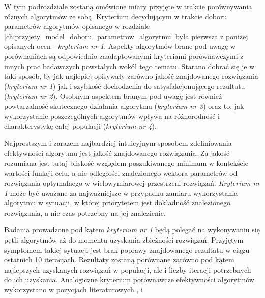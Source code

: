 \par
W tym podrozdziale zostaną omówione miary przyjęte w trakcie porównywania różnych algorytmów ze sobą. Kryterium decydującym w trakcie doboru parametrów algorytmów opisanego w rozdziale \ref{ch:przyjety_model_doboru_parametrow_algorytmu} była pierwsza z poniżej opisanych ocen - \emph{kryterium nr 1}. Aspekty algorytmów brane pod uwagę w porównaniach są odpowiednio zaadaptowanymi kryteriami porównawczymi z innych prac badawczych powstałych wokół tego tematu. Starano dobrać się je w taki sposób, by jak najlepiej opisywały zarówno jakość znajdowanego rozwiązania (\emph{kryterium nr 1}) jak i szybkość dochodzenia do satysfakcjonującego rezultatu (\emph{kryterium nr 2}). Osobnym aspektem branym pod uwagę jest również powtarzalność skutecznego działania algorytmu (\emph{kryterium nr 3}) oraz to, jak wykorzystanie poszczególnych algorytmów wpływa na różnorodność i charakterystykę całej populacji (\emph{kryterium nr 4}).

\par 
Najprostszym i zarazem najbardziej intuicyjnym sposobem zdefiniowania efektywności algorytmu jest jakość znajdowanego rozwiązania. Za jakość rozumiana jest tutaj bliskość względem poszukiwanego minimum w kontekście wartości funkcji celu, a nie odległości znalezionego wektora parametrów od rozwiązania optymalnego w wielowymiarowej przestrzeni rozwiązań. \emph{Kryterium nr 1} może być uważane za najważniejsze w przypadku zamiaru wykorzystania algorytmu w sytuacji, w której priorytetem jest dokładność znalezionego rozwiązania, a nie czas potrzebny na jej znalezienie. 
\par
Badania prowadzone pod kątem \emph{kryterium nr 1} będą polegać na wykonywaniu się pętli algorytmów aż do momentu uzyskania zbieżności rozwiązań. Przyjętym symptomem takiej sytuacji jest brak poprawy znajdowanego rezultatu w ciągu ostatnich 10 iteracjach. Rezultaty zostaną porównane zarówno pod kątem najlepszych uzyskanych rozwiązań w populacji, ale i liczby iteracji potrzebnych do ich uzyskania. Analogiczne kryterium porównawcze efektywności algorytmów wykorzystano w pozycjach literaturowych \cite{boyabatli2004parameter}, \cite{elbeltagi2005comparison} i \cite{ong2006classification}

